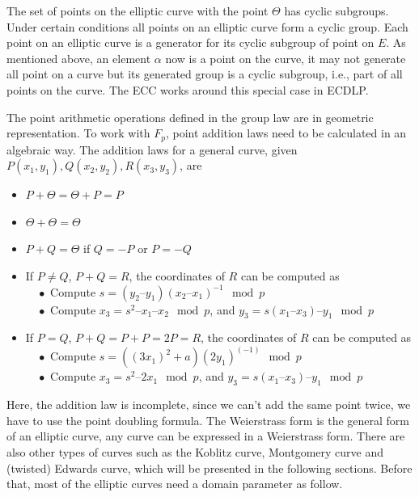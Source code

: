 The set of points on the elliptic curve with the point $\Theta$ has cyclic subgroups. Under certain conditions all points on an elliptic curve form a cyclic group. Each point on an elliptic curve is a generator for its cyclic subgroup of point on $E$. As mentioned above, an element $\alpha$ now is a point on the curve, it may not generate all point on a curve but its generated group is a cyclic subgroup, i.e., part of all points on the curve. The ECC works around this special case in ECDLP.

The point arithmetic operations defined in the group law are in geometric representation. To work with $F_p$, point addition laws need to be calculated in an algebraic way. The addition laws for a general curve, given $P(x_1, y_1), Q(x_2, y_2), R(x_3, y_3)$, are
\begin{itemize}
\item $P + \Theta = \Theta + P = P$\\
\item $\Theta + \Theta = \Theta$\\
\item $P + Q = \Theta$ if $Q = -P$ or $P = -Q$\\
\item If $P \neq Q$, $P + Q = R$, the coordinates of $R$ can be computed as\\
$\quad\bullet$ Compute $s = (y_2 – y_1) (x_2 – x_1)^{-1} \mod p$\\
$\quad\bullet$ Compute $x_3 = s^2 – x_1 – x_2 \mod p$, and $y_3 = s(x_1 – x_3) – y_1 \mod p$\\
\item If $P = Q$, $P + Q = P + P = 2P = R$, the coordinates of $R$ can be computed as\\
$\quad\bullet$ Compute $s = ((3x_1)^2 + a) (2y_1)^(-1) \mod p$\\
$\quad\bullet$ Compute $x_3 = s^2 – 2x_1 \mod p$, and $y_3 = s(x_1 – x_3) – y_1 \mod p$\\
  
\end{itemize} 

Here, the addition law is incomplete, since we can’t add the same point twice, we have to use the point doubling formula. The Weierstrass form is the general form of an elliptic curve, any curve can be expressed in a Weierstrass form. There are also other types of curves such as the Koblitz curve, Montgomery curve and (twisted) Edwards curve, which will be presented in the following sections. Before that, most of the elliptic curves need a domain parameter as follow.\\

